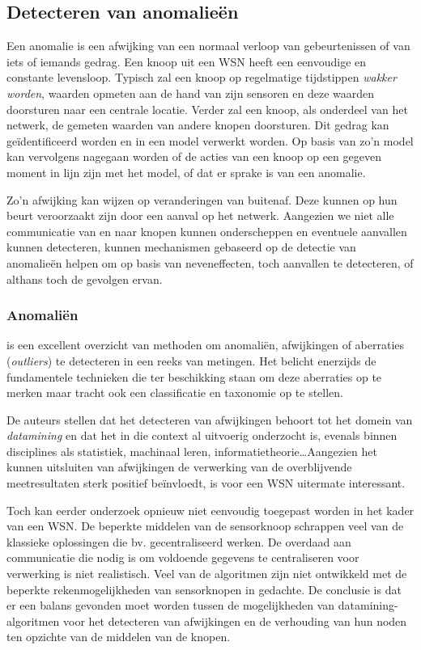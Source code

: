 
\subsection{Detecteren van anomalie\"en}
\label{subsection:anomaly}

Een anomalie is een afwijking van een normaal verloop van gebeurtenissen of van
iets of iemands gedrag. Een knoop uit een WSN heeft een eenvoudige en constante
levensloop. Typisch zal een knoop op regelmatige tijdstippen \emph{wakker
worden}, waarden opmeten aan de hand van zijn sensoren en deze waarden
doorsturen naar een centrale locatie. Verder zal een knoop, als onderdeel van
het netwerk, de gemeten waarden van andere knopen doorsturen. Dit gedrag kan
ge\"identificeerd worden en in een model verwerkt worden. Op basis van zo'n
model kan vervolgens nagegaan worden of de acties van een knoop op een gegeven
moment in lijn zijn met het model, of dat er sprake is van een anomalie.

Zo'n afwijking kan wijzen op veranderingen van buitenaf. Deze kunnen op hun
beurt veroorzaakt zijn door een aanval op het netwerk. Aangezien we niet alle
communicatie van en naar knopen kunnen onderscheppen en eventuele aanvallen
kunnen detecteren, kunnen mechanismen gebaseerd op de detectie van anomalie\"en
helpen om op basis van neveneffecten, toch aanvallen te detecteren, of althans
toch de gevolgen ervan.

\subsubsection*{Anomali\"en}
\label{subsubsection:outlier}

\citep{zhang2010outlier} is een excellent overzicht van methoden om
anomali\"en, afwijkingen of aberraties (\emph{outliers}) te detecteren in een
reeks van metingen. Het belicht enerzijds de fundamentele technieken die ter
beschikking staan om deze aberraties op te merken maar tracht ook een
classificatie en taxonomie op te stellen.

De auteurs stellen dat het detecteren van afwijkingen behoort tot het domein
van \emph{datamining} en dat het in die context al uitvoerig onderzocht is,
evenals binnen disciplines als statistiek, machinaal leren,
informatietheorie\dots Aangezien het kunnen uitsluiten van afwijkingen de
verwerking van de overblijvende meetresultaten sterk positief be\"invloedt, is
voor een WSN uitermate interessant.

Toch kan eerder onderzoek opnieuw niet eenvoudig toegepast worden in het kader
van een WSN. De beperkte middelen van de sensorknoop schrappen veel van de
klassieke oplossingen die bv. gecentraliseerd werken. De overdaad aan
communicatie die nodig is om voldoende gegevens te centraliseren voor
verwerking is niet realistisch. Veel van de algoritmen zijn niet ontwikkeld met
de beperkte rekenmogelijkheden van sensorknopen in gedachte. De conclusie is
dat er een balans gevonden moet worden tussen de mogelijkheden van
datamining-algoritmen voor het detecteren van afwijkingen en de verhouding van
hun noden ten opzichte van de middelen van de knopen.

